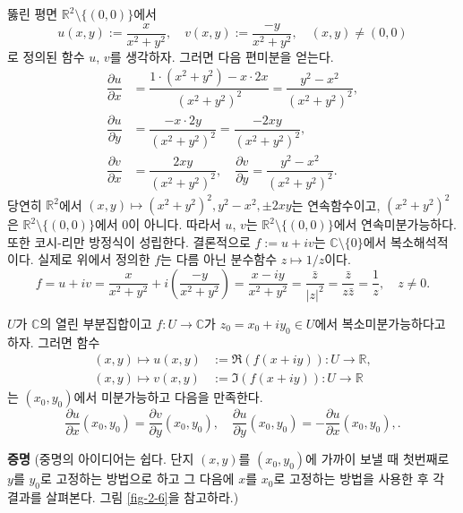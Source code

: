\begin{saltexample}{}{} \label{example-2-6}
뚫린 평면 $\mathbb R^2 \setminus \{(0,0)\}$에서 
\[
u(x,y) := \dfrac{x}{x^2+y^2}, \quad
v(x,y) := \dfrac{-y}{x^2+y^2}, \quad (x,y)\ne(0,0)
\]
로 정의된 함수 
$u$, $v$를 생각하자.
그러면 다음 편미분을 얻는다.
\begin{align*}
\dfrac{\partial u}{\partial x} &= \dfrac{1\cdot(x^2+y^2)-x\cdot 2x}{(x^2+y^2)^2}
= \dfrac{y^2-x^2}{(x^2+y^2)^2}, \\
\dfrac{\partial u}{\partial y} &= \dfrac{-x\cdot 2y}{(x^2+y^2)^2}
= \dfrac{-2xy}{(x^2+y^2)^2}, \\
\dfrac{\partial v}{\partial x} &= \dfrac{2xy}{(x^2+y^2)^2}, \quad
\dfrac{\partial v}{\partial y} = \dfrac{y^2-x^2}{(x^2+y^2)^2}.
\end{align*}
당연히 $\mathbb R^2$에서 $(x,y) \mapsto (x^2+y^2)^2, y^2-x^2, \pm 2xy$는 
연속함수이고, $(x^2+y^2)^2$은 $\mathbb R^2 \setminus \{(0,0)\}$에서 
$0$이 아니다.
따라서 $u$, $v$는 $\mathbb R^2 \setminus \{(0,0)\}$에서 
연속미분가능하다.
또한 코시-리만 방정식이 성립한다. 
결론적으로 $f:=u+iv$는 $\mathbb C\setminus\{0\}$에서 
복소해석적이다.
실제로 위에서 정의한 $f$는 다름 아닌 분수함수 $z\mapsto 1/z$이다.
\[
f=u+iv= \dfrac x{x^2+y^2}+i\left(\dfrac{-y}{x^2+y^2}\right)
= \dfrac{x-iy}{x^2+y^2} = \dfrac{\bar z}{|z|^2} = \dfrac{\bar z}{z \bar z}
= \dfrac  1z, \quad z\ne 0.
\]
\end{saltexample}

\begin{salttheorem}{}{} \label{thm-2-1}
$U$가 $\mathbb C$의 열린 부분집합이고
$f:U\to \mathbb C$가 $z_0=x_0+iy_0\in U$에서 복소미분가능하다고 하자.
그러면 함수
\begin{align*}
(x,y) \mapsto u(x,y) & := \Re(f(x+iy)): U\to \mathbb R, \\
(x,y) \mapsto v(x,y) & := \Im(f(x+iy)): U\to \mathbb R
\end{align*}
는 $(x_0, y_0)$에서 미분가능하고 다음을 만족한다.
\begin{equation} \label{eq-2-3}
\dfrac{\partial u}{\partial x}(x_0,y_0) = \dfrac{\partial v}{\partial y}(x_0,y_0),
\quad
\dfrac{\partial u}{\partial y}(x_0,y_0) = - \dfrac{\partial u}{\partial x}(x_0,y_0),.
\end{equation}
\end{salttheorem}

{\bf 증명}
(중명의 아이디어는 쉽다. 단지 $(x,y)$를 $(x_0, y_0)$에 가까이 보낼 때
첫번째로 $y$를 $y_0$로 고정하는 방법으로 하고 그 다음에 
$x$를 $x_0$로 고정하는 방법을 사용한 후 각 결과를 살펴본다.
그림 \ref{fig-2-6}을 참고하라.)

